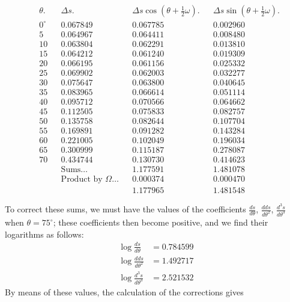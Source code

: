 \documentclass{article}
\begin{document}
\[ \begin{aligned} &\theta. && \Delta s. && \Delta s\cos(\theta+\tfrac{1}{2}\omega). && \Delta s\sin(\theta+\tfrac{1}{2}\omega).\\ &0^{\circ} && 0.067849 && 0.067785 && 0.002960\\ &5 && 0.064967 && 0.064411 && 0.008480\\ &10 && 0.063804 && 0.062291 && 0.013810\\ &15 && 0.064212 && 0.061240 && 0.019309\\ &20 && 0.066195 && 0.061156 && 0.025332\\ &25 && 0.069902 && 0.062003 && 0.032277\\ &30 && 0.075647 && 0.063800 && 0.040645\\ &35 && 0.083965 && 0.066614 && 0.051114\\ &40 && 0.095712 && 0.070566 && 0.064662\\ &45 && 0.112505 && 0.075833 && 0.082757\\ &50 && 0.135758 && 0.082644 && 0.107704\\ &55 && 0.169891 && 0.091282 && 0.143284\\ &60 && 0.221005 && 0.102049 && 0.196034\\ &65 && 0.300999 && 0.115187 && 0.278087\\ &70 && 0.434744 && 0.130730 && 0.414623\\ & && \text{Sums}\ldots && 1.177591 && 1.481078\\ & && \text{Product by }\Omega\ldots && 0.000374 && 0.000470\\ & && && 1.177965 && 1.481548 \end{aligned} \]

To correct these sums, we must have the values of the coefficients $\frac{ds}{d\theta}$, $\frac{dds}{d\theta^{2}}$, $\frac{d^{3}s}{d\theta^{3}}$ when $\theta=75^{\circ}$; these coefficients then become positive, and we find their logarithms as follows:
\[ \begin{aligned} \log\frac{ds}{d\theta}&=0.784599\\ \log\frac{dds}{d\theta^{2}}&=1.492717\\ \log\frac{d^{3}s}{d\theta^{3}}&=2.521532 \end{aligned} \]
By means of these values, the calculation of the corrections gives
\end{document}
